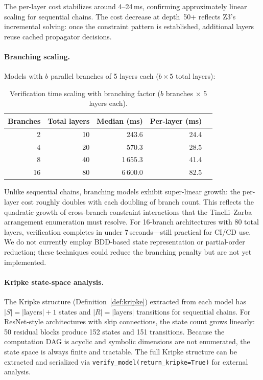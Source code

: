 \documentclass[11pt]{article}
\begin{document}
The per-layer cost stabilizes around 4--24\,ms, confirming
approximately linear scaling for sequential chains.  The cost
decrease at depth~50+ reflects Z3's incremental solving: once
the constraint pattern is established, additional layers reuse
cached propagator decisions.

\paragraph{Branching scaling.}
Models with $b$ parallel branches of 5 layers each ($b \times 5$
total layers):

\begin{table}[h]
\centering
\caption{Verification time scaling with branching factor
  ($b$ branches $\times$ 5 layers each).}
\label{tab:branch-scaling}
\small
\begin{tabular}{@{}rrrrr@{}}
\toprule
\textbf{Branches} & \textbf{Total layers} & \textbf{Median (ms)} &
  \textbf{Per-layer (ms)} \\
\midrule
 2 &  10 &   243.6 & 24.4 \\
 4 &  20 &   570.3 & 28.5 \\
 8 &  40 & 1\,655.3 & 41.4 \\
16 &  80 & 6\,600.0 & 82.5 \\
\bottomrule
\end{tabular}
\end{table}

Unlike sequential chains, branching models exhibit super-linear
growth: the per-layer cost roughly doubles with each doubling
of branch count.  This reflects the quadratic growth of cross-branch
constraint interactions that the Tinelli--Zarba arrangement
enumeration must resolve.  For 16-branch architectures with 80
total layers, verification completes in under 7\,seconds---still
practical for CI/CD use.  We do not currently employ BDD-based
state representation or partial-order reduction; these techniques
could reduce the branching penalty but are not yet implemented.

\paragraph{Kripke state-space analysis.}
The Kripke structure (Definition~\ref{def:kripke}) extracted from each
model has $|S| = |\text{layers}| + 1$ states and $|R| = |\text{layers}|$
transitions for sequential chains.  For ResNet-style architectures with
skip connections, the state count grows linearly: 50 residual blocks
produce 152 states and 151 transitions.  Because the computation DAG is
acyclic and symbolic dimensions are not enumerated, the state space is
always finite and tractable.  The full Kripke structure can be extracted
and serialized via \texttt{verify\_model(return\_kripke=True)} for
external analysis.
\end{document}
